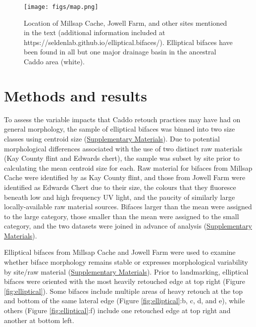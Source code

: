 \documentclass[]{interact}
\theoremstyle{plain}%
\theoremstyle{definition}
\theoremstyle{remark}
\begin{document}
\begin{figure}\centering
\texttt{[image: figs/map.png]}
\caption{Location of Millsap Cache, Jowell Farm, and other sites mentioned in the text (additional information included at https://seldenlab.github.io/elliptical.bifaces/). Elliptical bifaces have been found in all but one major drainage basin in the ancestral Caddo area (white).}
\label{fig:map}
\end{figure}

\hypertarget{methods-and-results}{%
\section{Methods and results}\label{methods-and-results}}

To assess the variable impacts that Caddo retouch practices may have had
on general morphology, the sample of elliptical bifaces was binned into
two size classes using centroid size
(\href{https://seldenlab.github.io/elliptical.bifaces/}{Supplementary
Materials}). Due to potential morphological differences associated with
the use of two distinct raw materials (Kay County flint and Edwards
chert), the sample was subset by site prior to calculating the mean
centroid size for each. Raw material for bifaces from Millsap Cache were
identified by \citet{RN11461} as Kay County flint, and those from Jowell
Farm were identified as Edwards Chert due to their size, the colours
that they fluoresce beneath low and high frequency UV light, and the
paucity of similarly large locally-available raw material sources.
Bifaces larger than the mean were assigned to the large category, those
smaller than the mean were assigned to the small category, and the two
datasets were joined in advance of analysis
(\href{https://seldenlab.github.io/elliptical.bifaces/}{Supplementary
Materials}).

Elliptical bifaces from Millsap Cache and Jowell Farm were used to
examine whether biface morphology remains stable or expresses
morphological variability by site/raw material
(\href{https://seldenlab.github.io/elliptical.bifaces/gm---siteraw-material.html}{Supplementary
Materials}). Prior to landmarking, elliptical bifaces were oriented with
the most heavily retouched edge at top right (Figure
\ref{fig:elliptical}). Some bifaces include multiple areas of heavy
retouch at the top and bottom of the same lateral edge (Figure
\ref{fig:elliptical}:b, c, d, and e), while others (Figure
\ref{fig:elliptical}:f) include one retouched edge at top right and
another at bottom left.
\end{document}
